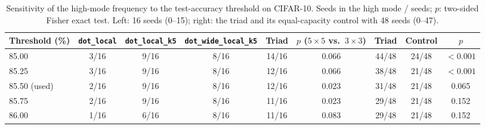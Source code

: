 
\begin{table}[!t]
\centering
\footnotesize
\caption{Sensitivity of the high-mode frequency to the test-accuracy threshold on CIFAR-10. Seeds in the high mode / seeds; $p$: two-sided Fisher exact test. Left: 16 seeds (0--15); right: the triad and its equal-capacity control with 48 seeds (0--47).}
\label{tab:umbral}
\begin{adjustbox}{max width=\linewidth}
\begin{tabular}{lcccccccc}
\toprule
Threshold (\%) & \texttt{dot\_local} & \texttt{dot\_local\_k5} & \texttt{dot\_wide\_local\_k5} & Triad & $p$ ($5\times5$ vs.\ $3\times3$) & Triad & Control & $p$ \\
\midrule
85.00 & 3/16 & 9/16 & 8/16 & 14/16 & 0.066 & 44/48 & 24/48 & $<0.001$ \\
85.25 & 3/16 & 9/16 & 8/16 & 12/16 & 0.066 & 38/48 & 21/48 & $<0.001$ \\
85.50 (used) & 2/16 & 9/16 & 8/16 & 12/16 & 0.023 & 31/48 & 21/48 & 0.065 \\
85.75 & 2/16 & 9/16 & 8/16 & 11/16 & 0.023 & 29/48 & 21/48 & 0.152 \\
86.00 & 1/16 & 6/16 & 8/16 & 11/16 & 0.083 & 29/48 & 21/48 & 0.152 \\
\bottomrule
\end{tabular}
\end{adjustbox}
\end{table}
